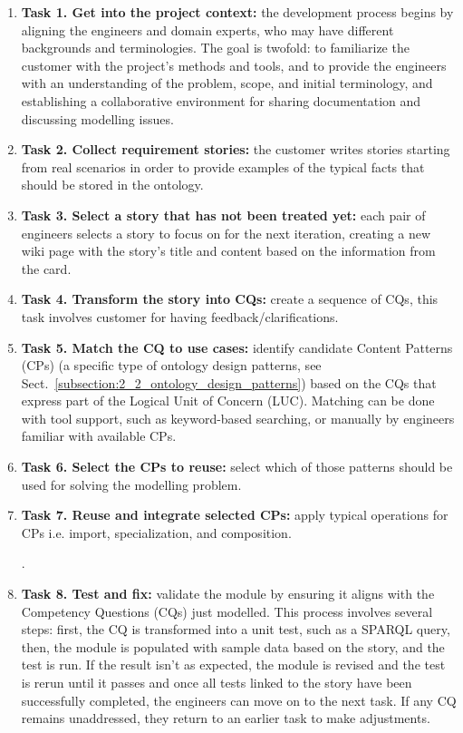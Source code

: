 \begin{enumerate}
    \item \textbf{Task 1. Get into the project context:} the development process begins by aligning the engineers and domain experts, who may have different backgrounds and terminologies. The goal is twofold: to familiarize the customer with the project's methods and tools, and to provide the engineers with an understanding of the problem, scope, and initial terminology, and establishing a collaborative environment for sharing documentation and discussing modelling issues.

    \item \textbf{Task 2. Collect requirement stories:} the customer writes stories starting from real scenarios in order to provide examples of the typical facts that should be stored in the ontology.

    \item \textbf{Task 3. Select a story that has not been treated yet:} each pair of engineers selects a story to focus on for the next iteration, creating a new wiki page with the story's title and content based on the information from the card.

    \item \textbf{Task 4. Transform the story into CQs:} create a sequence of CQs, this task involves customer for having feedback/clarifications.

    \item \textbf{Task 5. Match the CQ to use cases:} identify candidate Content Patterns (CPs) (a specific type of ontology design patterns, see Sect.~\ref{subsection:2_2_ontology_design_patterns}) based on the CQs that express part of the Logical Unit of Concern (LUC). Matching can be done with tool support, such as keyword-based searching, or manually by engineers familiar with available CPs.

    \item \textbf{Task 6. Select the CPs to reuse:} select which of those patterns should be used for solving the modelling problem.

    \item \textbf{Task 7. Reuse and integrate selected CPs:} apply typical operations for CPs i.e. import, specialization, and composition. 

    .
    \item \textbf{Task 8. Test and fix:} validate the module by ensuring it aligns with the Competency Questions (CQs) just modelled. This process involves several steps: first, the CQ is transformed into a unit test, such as a SPARQL query, then, the module is populated with sample data based on the story, and the test is run. If the result isn't as expected, the module is revised and the test is rerun until it passes and once all tests linked to the story have been successfully completed, the engineers can move on to the next task. If any CQ remains unaddressed, they return to an earlier task to make adjustments.


\end{enumerate}
